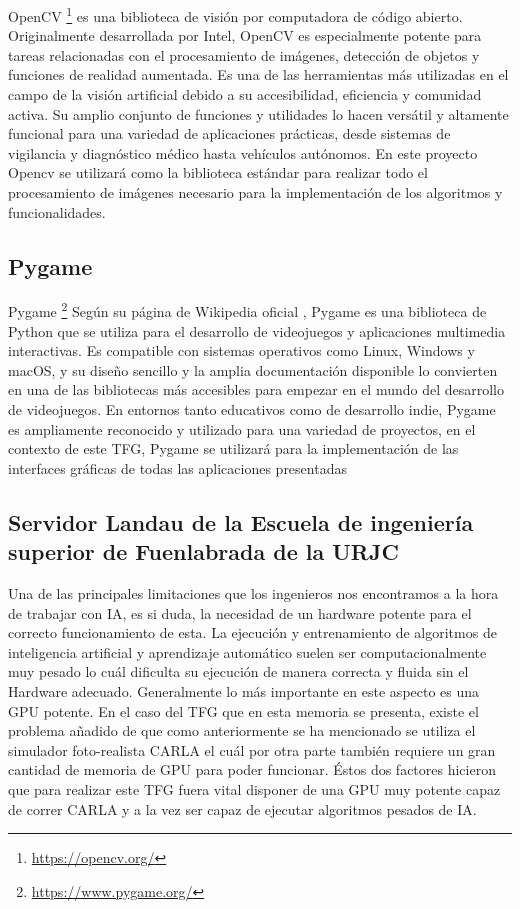 OpenCV \footnote{\url{https://opencv.org/}} es una biblioteca de visión por computadora de código abierto. Originalmente desarrollada por Intel, OpenCV es especialmente potente para tareas relacionadas con el procesamiento de imágenes, detección de objetos y funciones de realidad aumentada. Es una de las herramientas más utilizadas en el campo de la visión artificial debido a su accesibilidad, eficiencia y comunidad activa. Su amplio conjunto de funciones y utilidades lo hacen versátil y altamente funcional para una variedad de aplicaciones prácticas, desde sistemas de vigilancia y diagnóstico médico hasta vehículos autónomos. En este proyecto Opencv se utilizará como la biblioteca estándar para realizar todo el procesamiento de imágenes necesario para la implementación de los algoritmos y funcionalidades.


\subsection{Pygame}
\label{subsec:Pygame}

Pygame \footnote{\url{https://www.pygame.org/}} Según su página de Wikipedia oficial \cite{pygame}, Pygame es una biblioteca de Python que se utiliza para el desarrollo de videojuegos y aplicaciones multimedia interactivas. Es compatible con sistemas operativos como Linux, Windows y macOS, y su diseño sencillo y la amplia documentación disponible lo convierten en una de las bibliotecas más accesibles para empezar en el mundo del desarrollo de videojuegos. En entornos tanto educativos como de desarrollo indie, Pygame es ampliamente reconocido y utilizado para una variedad de proyectos, en el contexto de este \ac{TFG}, Pygame se utilizará para la implementación de las interfaces gráficas de todas las aplicaciones presentadas

\subsection{Servidor Landau de la Escuela de ingeniería superior de Fuenlabrada de la URJC}
\label{subsec:Servidor landau de la URJC}

Una de las principales limitaciones que los ingenieros nos encontramos a la hora de trabajar con \ac{IA}, es si duda, la necesidad de un hardware potente para el correcto funcionamiento de esta. La ejecución y entrenamiento de algoritmos de inteligencia artificial y aprendizaje automático suelen ser computacionalmente muy pesado lo cuál dificulta su ejecución de manera correcta y fluida sin el Hardware adecuado. Generalmente lo más importante en este aspecto es una \ac{GPU} potente. En el caso del \ac{TFG} que en esta memoria se presenta, existe el problema añadido de que como anteriormente se ha mencionado se utiliza el simulador foto-realista CARLA el cuál por otra parte también requiere un gran cantidad de memoria de \ac{GPU} para poder funcionar. Éstos dos factores hicieron que para realizar este \ac{TFG} fuera vital disponer de una \ac{GPU} muy potente capaz de correr CARLA y a la vez ser capaz de ejecutar algoritmos pesados de \ac{IA}.

